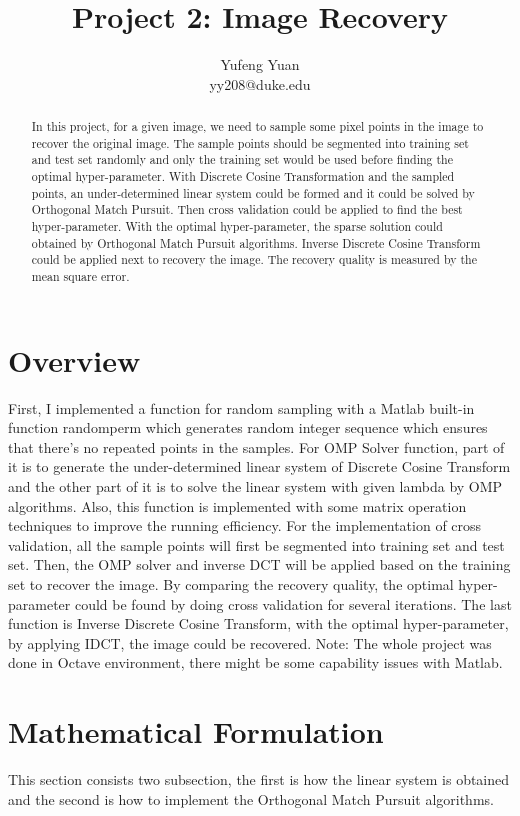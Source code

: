 \documentclass{article}
\title{Project 2: Image Recovery}
\author{Yufeng Yuan\\ 
yy208@duke.edu}
\begin{document}
\maketitle

\begin{abstract}
  In this project, for a given image, we need to sample some pixel points in the image to recover the original image. The sample points should be segmented into training set and test set randomly and only the training set would be used before finding the optimal hyper-parameter. With Discrete Cosine Transformation and the sampled points, an under-determined linear system could be formed and it could be solved by Orthogonal Match Pursuit. Then cross validation could be applied to find the best hyper-parameter. With the optimal hyper-parameter, the sparse solution could obtained by Orthogonal Match Pursuit algorithms. Inverse Discrete Cosine Transform could be applied next to recovery the image. The recovery quality is measured by the mean square error.

\end{abstract}

\section{Overview}

First, I implemented a function for random sampling with a Matlab built-in function randomperm which generates random integer sequence which ensures that there's no repeated points in the samples. For OMP Solver function, part of it is to generate the under-determined linear system of Discrete Cosine Transform and the other part of it is to solve the linear system with given lambda by OMP algorithms. Also, this function is implemented with some matrix operation techniques to improve the running efficiency. For the implementation of cross validation, all the sample points will first be segmented into training set and test set. Then, the OMP solver and inverse DCT will be applied based on the training set to recover the image. By comparing the recovery quality, the optimal hyper-parameter could be found by doing cross validation for several iterations. The last function is Inverse Discrete Cosine Transform, with the optimal hyper-parameter, by applying IDCT, the image could be recovered. Note: The whole project was done in Octave environment, there might be some capability issues with Matlab.

\section{Mathematical Formulation}
This section consists two subsection, the first is how the linear system is obtained and the second is how to implement the Orthogonal Match Pursuit algorithms.
\end{document}
